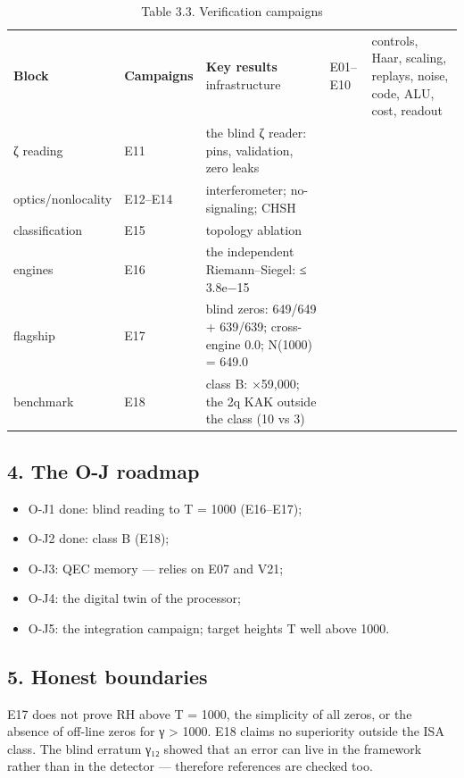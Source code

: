 \documentclass[11pt,a4paper]{article}
\begin{document}
\begin{table}[htbp]\centering\small
\caption{Table 3.3. Verification campaigns}
\begin{tabular}{p{} p{} p{}}
\toprule
\textbf{Block} & \textbf{Campaigns} & \textbf{Key results}
\midrule
infrastructure & E01–E10 & controls, Haar, scaling, replays, noise, code, ALU, cost, readout \\
ζ reading & E11 & the blind ζ reader: pins, validation, zero leaks \\
optics/nonlocality & E12–E14 & interferometer; no-signaling; CHSH \\
classification & E15 & topology ablation \\
engines & E16 & the independent Riemann–Siegel: ≤ 3.8e−15 \\
flagship & E17 & blind zeros: 649/649 + 639/639; cross-engine 0.0; N(1000) = 649.0 \\
benchmark & E18 & class B: ×59,000; the 2q KAK outside the class (10 vs 3) \\
\bottomrule
\end{tabular}
\end{table}

\subsection{4. The O-J roadmap}

\begin{itemize}
  \item O-J1 done: blind reading to T = 1000 (E16–E17);
  \item O-J2 done: class B (E18);
  \item O-J3: QEC memory — relies on E07 and V21;
  \item O-J4: the digital twin of the processor;
  \item O-J5: the integration campaign; target heights T well above 1000.
\end{itemize}

\subsection{5. Honest boundaries}

E17 does not prove RH above T = 1000, the simplicity of all zeros, or the absence of off-line zeros for γ > 1000. E18 claims no superiority outside the ISA class. The blind erratum γ₁₂ showed that an error can live in the framework rather than in the detector — therefore references are checked too.
\end{document}
